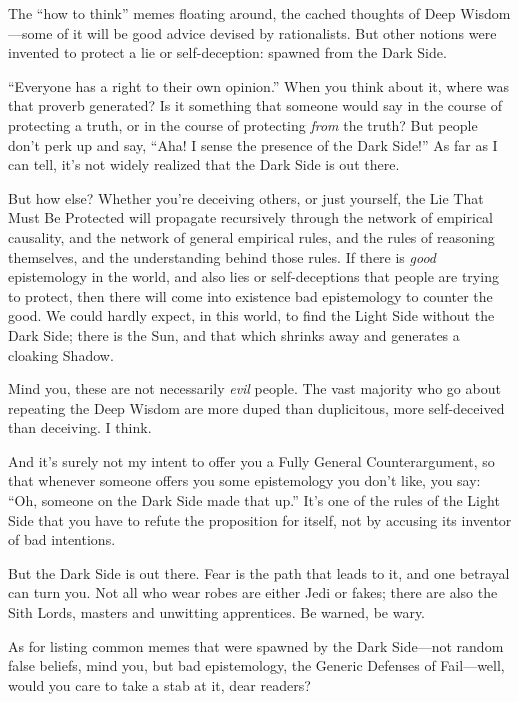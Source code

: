 {
 The ``how to think'' memes
floating around, the cached thoughts of Deep Wisdom---some of it will
be good advice devised by rationalists. But other notions were invented
to protect a lie or self-deception: spawned from the Dark Side.}

{
 ``Everyone has a right to their own
opinion.'' When you think about it, where was that
proverb generated? Is it something that someone would say in the course
of protecting a truth, or in the course of protecting \textit{from} the
truth? But people don't perk up and say,
``Aha! I sense the presence of the Dark
Side!'' As far as I can tell, it's
not widely realized that the Dark Side is out there.}

{
 But how else? Whether you're deceiving others, or
just yourself, the Lie That Must Be Protected will propagate
recursively through the network of empirical causality, and the network
of general empirical rules, and the rules of reasoning themselves, and
the understanding behind those rules. If there is \textit{good}
epistemology in the world, and also lies or self-deceptions that people
are trying to protect, then there will come into existence bad
epistemology to counter the good. We could hardly expect, in this
world, to find the Light Side without the Dark Side; there is the Sun,
and that which shrinks away and generates a cloaking Shadow.}

{
 Mind you, these are not necessarily \textit{evil} people. The vast
majority who go about repeating the Deep Wisdom are more duped than
duplicitous, more self-deceived than deceiving. I think.}

{
 And it's surely not my intent to offer you a Fully
General Counterargument, so that whenever someone offers you some
epistemology you don't like, you say:
``Oh, someone on the Dark Side made that
up.'' It's one of the rules of the
Light Side that you have to refute the proposition for itself, not by
accusing its inventor of bad intentions.}

{
 But the Dark Side is out there. Fear is the path that leads to it,
and one betrayal can turn you. Not all who wear robes are either Jedi
or fakes; there are also the Sith Lords, masters and unwitting
apprentices. Be warned, be wary.}

{
 As for listing common memes that were spawned by the Dark
Side---not random false beliefs, mind you, but bad epistemology, the
Generic Defenses of Fail---well, would you care to take a stab at it,
dear readers?}

\myendsectiontext

